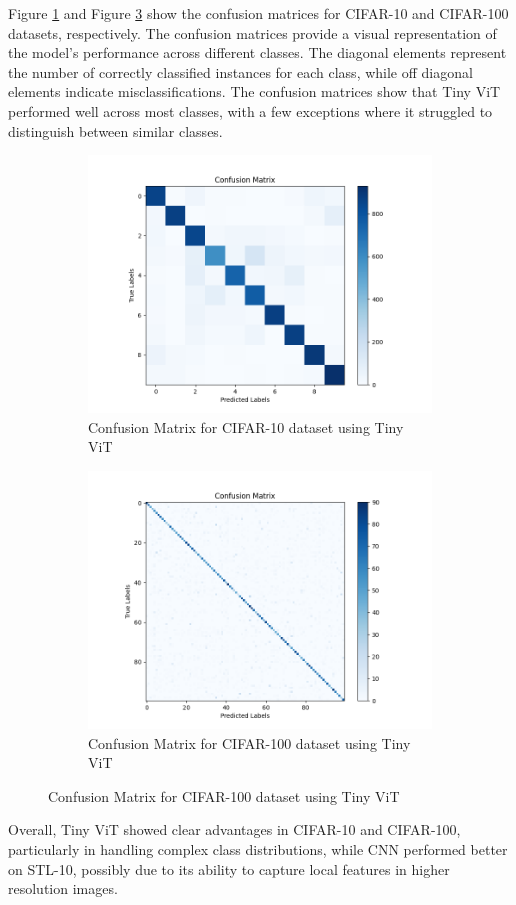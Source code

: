 Figure \ref{fig:conf-10} and Figure \ref{fig:conf-100} show the confusion matrices for CIFAR-10 and CIFAR-100 datasets, respectively. The confusion matrices provide a visual representation of the model's performance across different classes. The diagonal elements represent the number of correctly classified instances for each class, while off diagonal elements indicate misclassifications. The confusion matrices show that Tiny ViT performed well across most classes, with a few exceptions where it struggled to distinguish between similar classes.
\begin{figure}[!ht]
  \centering
  \begin{subfigure}[t]{0.48\columnwidth}
      \includegraphics[width=\textwidth]{./images/cm_vit_cifar10.png}
      \caption{Confusion Matrix for CIFAR-10 dataset using Tiny ViT}
      \label{fig:conf-10}
  \end{subfigure}
  \hfill
  \begin{subfigure}[t]{0.48\columnwidth}
      \includegraphics[width=\textwidth]{./images/cm_vit_cifar100.png}
      \caption{Confusion Matrix for CIFAR-100 dataset using Tiny ViT}
      \label{fig:conf-100}
  \end{subfigure}
\end{figure}

Overall, Tiny ViT showed clear advantages in CIFAR-10 and CIFAR-100, particularly in handling complex class distributions, while CNN performed better on STL-10, possibly due to its ability to capture local features in higher resolution images.